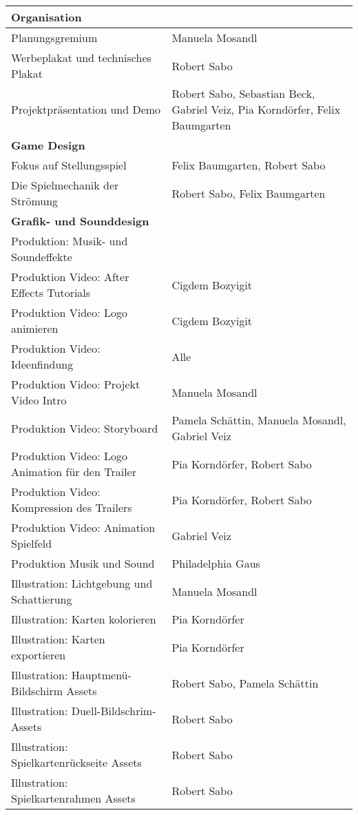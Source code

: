 \begin{longtable}{|p{8cm}|p{10cm}|}
\hline
\textbf{Organisation} &  \\ \hline
Planungsgremium & Manuela Mosandl \\ \hline
Werbeplakat und technisches Plakat & Robert Sabo \\ \hline
Projektpräsentation und Demo & Robert Sabo, Sebastian Beck, Gabriel Veiz, Pia Korndörfer, Felix Baumgarten \\ \hline
\textbf{Game Design} &  \\ \hline
Fokus auf Stellungsspiel & Felix Baumgarten, Robert Sabo \\ \hline
Die Spielmechanik der Strömung & Robert Sabo, Felix Baumgarten \\ \hline
\textbf{Grafik- und Sounddesign} & \\ \hline
Produktion: Musik- und Soundeffekte & \\ \hline
Produktion Video: After Effects Tutorials & Cigdem Bozyigit \\ \hline
Produktion Video: Logo animieren & Cigdem Bozyigit \\ \hline
Produktion Video: Ideenfindung & Alle \\ \hline
Produktion Video: Projekt Video Intro & Manuela Mosandl \\ \hline
Produktion Video: Storyboard & Pamela Schättin, Manuela Mosandl, Gabriel Veiz \\ \hline
Produktion Video: Logo Animation für den Trailer & Pia Korndörfer, Robert Sabo \\ \hline
Produktion Video: Kompression des Trailers & Pia Korndörfer, Robert Sabo \\ \hline
Produktion Video: Animation Spielfeld & Gabriel Veiz \\ \hline
Produktion Musik und Sound & Philadelphia Gaus \\ \hline
Illustration: Lichtgebung und Schattierung & Manuela Mosandl \\ \hline
Illustration: Karten kolorieren & Pia Korndörfer \\ \hline
Illustration: Karten exportieren & Pia Korndörfer \\ \hline
Illustration: Hauptmenü-Bildschirm Assets & Robert Sabo, Pamela Schättin \\ \hline
Illustration: Duell-Bildschrim-Assets & Robert Sabo \\ \hline
Illustration: Spielkartenrückseite Assets & Robert Sabo \\ \hline
Illustration: Spielkartenrahmen Assets & Robert Sabo \\ \hline

\end{longtable}
